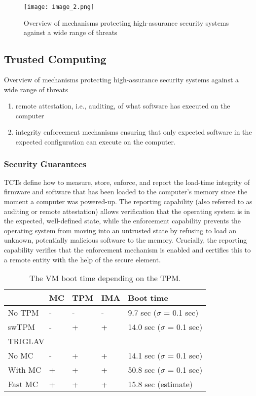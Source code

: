 \documentclass[acmtog]{acmart}
\begin{document}
\begin{figure}[H]
    \centering
    \texttt{[image: image\_2.png]}
    \caption{Overview of mechanisms protecting high-assurance security systems against a wide range of threats}
    \label{3}
\end{figure}
\subsection{Trusted Computing}
\raggedright Overview of mechanisms protecting high-assurance security systems against a wide range of threats
\noindent
\begin{enumerate}
\item remote attestation, i.e., auditing, of what software has executed on the computer 
\item integrity enforcement mechanisms ensuring that only expected software in the expected configuration can execute on the computer. 
\end{enumerate}
\subsubsection{Security Guarantees}
\raggedright TCTs define how to measure, store, enforce, and report the load-time integrity of firmware and software that has been loaded to the computer’s memory since the moment a computer was powered-up. The reporting capability (also referred to as auditing or remote attestation) allows verification that the operating system is in the expected, well-defined state, while the enforcement capability prevents the operating system from moving into an untrusted state by refusing to load an unknown, potentially malicious software to the memory. Crucially, the reporting capability verifies that the enforcement mechanism is enabled and certifies this to a remote entity with the help of the secure element.

\begin{table}[h!]
    \begin{center}
        \caption{The VM boot time depending on the TPM.}
        \label{5}
          \begin{tabular}{|p{3cm}|p{2cm}|p{2cm}|p{2cm}|p{4.5cm}|}
          \hline
           &MC&TPM&IMA&Boot time\\
          \hline
          No TPM&-&-&-&9.7 sec ($\sigma$ = 0.1 sec)\\
          \hline
          swTPM&-&+&+&14.0 sec ($\sigma$ = 0.1 sec)\\
          \hline
          \multicolumn{5}{|l|}{TRIGLAV}\\
          \hline
          No MC&-&+&+&14.1 sec ($\sigma$ = 0.1 sec)\\
          \hline
          With MC&+&+&+&50.8 sec ($\sigma$ = 0.1 sec)\\
          \hline
          Fast MC&+&+&+&15.8 sec (estimate)\\
          \hline
          \end{tabular}
   \end{center}
\end{table}
\end{document}
